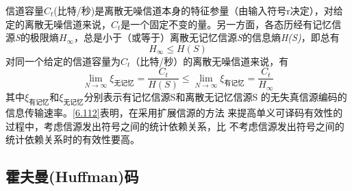 \documentclass[UTF8]{ctexart}
\theoremstyle{plain}
\theoremstyle{definition}
\theoremstyle{remark}
\begin{document}
信道容量$C_t$(比特/秒)是离散无噪信道本身的特征参量（由输入符号r决定），对给定的离散无噪信道来说，$C_t$是一个固定不变的量。另一方面，各态历经有记忆信源\emph{S}的极限熵$H_{\infty}$，总是小于（或等于）离散无记忆信源\emph{S}的信息熵\emph{H(S)}，即总有
\begin{equation}
\label{6.111}
H_{\infty} \leqslant H(S)
\end{equation}
对同一个给定的信道容量为$C_t$（比特/秒）的离散无噪信道来说，有
\begin{equation}
\label{6.112}
\lim\limits_{N \rightarrow \infty}\xi_{\text{无记忆}}=\dfrac{C_t}{H(S)}\leqslant\lim\limits_{N \rightarrow \infty}\xi_{\text{有记忆}}=\dfrac{C_t}{H_{\infty}}
\end{equation}
其中$\xi_{有记忆}$和$\xi_{无记忆}$分别表示有记忆信源S和离散无记忆信源S
的无失真信源编码的信息传输速率。\cref{6.112}表明，在采用扩展信源的方法
来提高单义可译码有效性的过程中，考虑信源发出符号之间的统计依赖关系，比
不考虑信源发出符号之间的统计依赖关系时的有效性要高。


\subsection{霍夫曼(Huffman)码}
















%
\end{document}
